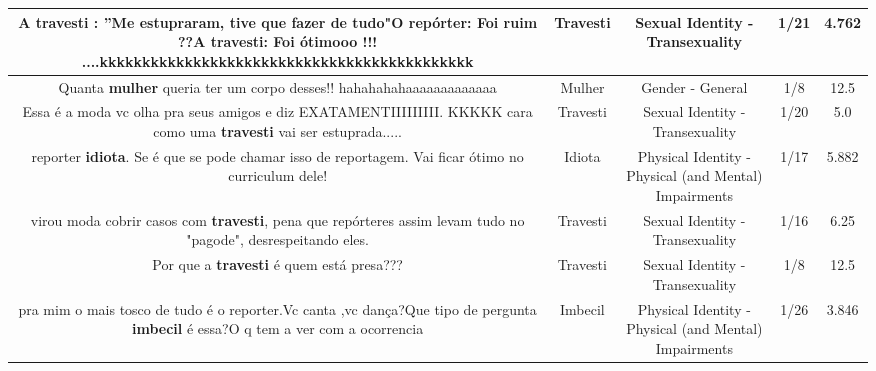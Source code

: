 \documentclass[11pt]{article}
\newlength\mylength
\begin{document}
\begin{center}
\begin{longtable}{|C{.65\mylength}|C{.30\mylength}|C{.12\mylength}|C{.12\mylength}|C{.12\mylength}|}
  \small A \textbf{travesti} : ''Me estupraram, tive que fazer de tudo"O repórter: Foi ruim ??A \textbf{travesti}: Foi ótimooo !!! ....kkkkkkkkkkkkkkkkkkkkkkkkkkkkkkkkkkkkkkkkkkkk\normalsize   & Travesti & Sexual Identity - Transexuality & 1/21 & 4.762 \\  \hline
  \small Quanta \textbf{mulher} queria ter um corpo desses!! hahahahahaaaaaaaaaaaaa\normalsize   & Mulher & Gender - General & 1/8 & 12.5 \\  \hline
  \small Essa é a moda vc olha pra seus amigos e diz EXATAMENTIIIIIIIII. KKKKK cara como uma \textbf{travesti} vai ser estuprada.....\normalsize   & Travesti & Sexual Identity - Transexuality & 1/20 & 5.0 \\  \hline
  \small reporter \textbf{idiota}. Se é que se pode chamar isso de reportagem. Vai ficar ótimo no curriculum dele!\normalsize   & Idiota & Physical Identity - Physical (and Mental) Impairments & 1/17 & 5.882 \\  \hline
  \small virou moda cobrir casos com \textbf{travesti}, pena que repórteres assim levam tudo no "pagode", desrespeitando eles.\normalsize   & Travesti & Sexual Identity - Transexuality & 1/16 & 6.25 \\  \hline
  \small Por que a \textbf{travesti} é quem está presa???\normalsize   & Travesti & Sexual Identity - Transexuality & 1/8 & 12.5 \\  \hline
  \small pra mim o mais tosco de tudo é o reporter.Vc canta ,vc dança?Que tipo de pergunta \textbf{imbecil} é essa?O q tem a ver com a ocorrencia\normalsize   & Imbecil & Physical Identity - Physical (and Mental) Impairments & 1/26 & 3.846 \\  \hline
  
\end{longtable}
\end{center}
\end{document}
